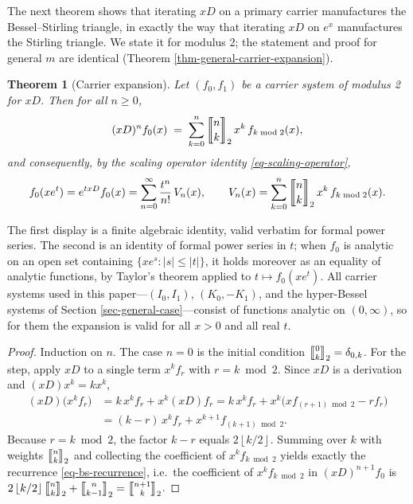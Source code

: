 \documentclass[a4paper]{amsart}
\numberwithin{equation}{section}
\newcommand{\mStirling}[0]{\genfrac{\llbracket}{\rrbracket}{0pt}{}}
\newcommand{\floor}[1]{\left\lfloor #1 \right\rfloor}
\newtheorem{theorem}{Theorem}[section]
\begin{document}
The next theorem shows that iterating $xD$ on a primary carrier manufactures the Bessel--Stirling triangle, in exactly the way that iterating $xD$ on $e^x$ manufactures the Stirling triangle. We state it for modulus 2; the statement and proof for general $m$ are identical (Theorem \ref{thm-general-carrier-expansion}).

\begin{theorem}[Carrier expansion]\label{thm-carrier-expansion}
Let $(f_0, f_1)$ be a carrier system of modulus 2 for $xD$. Then for all $n \geq 0$,
\[
(xD)^n f_0(x) \;=\; \sum_{k=0}^{n} \mStirling{n}{k}_2\, x^k\, f_{k \bmod 2}(x),
\]
and consequently, by the scaling operator identity \eqref{eq-scaling-operator},
\[
f_0(x e^t) = e^{txD}f_0(x) = \sum_{n=0}^\infty\frac{t^n}{n!}\, V_n(x), \qquad V_n(x) = \sum_{k=0}^{n} \mStirling{n}{k}_2\, x^k\, f_{k \bmod 2}(x).
\]
\end{theorem}

The first display is a finite algebraic identity, valid verbatim for formal power series. The second is an identity of formal power series in $t$; when $f_0$ is analytic on an open set containing $\{xe^s : \lvert s \rvert \leq \lvert t \rvert\}$, it holds moreover as an equality of analytic functions, by Taylor's theorem applied to $t \mapsto f_0(xe^t)$. All carrier systems used in this paper---$(I_0, I_1)$, $(K_0, -K_1)$, and the hyper-Bessel systems of Section \ref{sec-general-case}---consist of functions analytic on $(0,\infty)$, so for them the expansion is valid for all $x > 0$ and all real $t$.

\begin{proof}
Induction on $n$. The case $n = 0$ is the initial condition $\mStirling{0}{k}_2 = \delta_{0,k}$. For the step, apply $xD$ to a single term $x^k f_r$ with $r = k \bmod 2$. Since $xD$ is a derivation and $(xD)x^k = kx^k$,
\[
\begin{aligned}
(xD)\big(x^k f_r\big) &= k\,x^k f_r + x^k (xD)f_r = k\,x^k f_r + x^k\big(x f_{(r+1) \bmod 2} - r f_r\big) \\
&= (k - r)\,x^k f_r + x^{k+1} f_{(k+1) \bmod 2}.
\end{aligned}
\]
Because $r = k \bmod 2$, the factor $k - r$ equals $2\floor{k/2}$. Summing over $k$ with weights $\mStirling{n}{k}_2$ and collecting the coefficient of $x^k f_{k \bmod 2}$ yields exactly the recurrence \eqref{eq-bs-recurrence}, i.e.\ the coefficient of $x^kf_{k\bmod 2}$ in $(xD)^{n+1}f_0$ is $2\floor{k/2} \mStirling{n}{k}_2 + \mStirling{n}{k-1}_2 = \mStirling{n+1}{k}_2$.
\end{proof}
\end{document}
